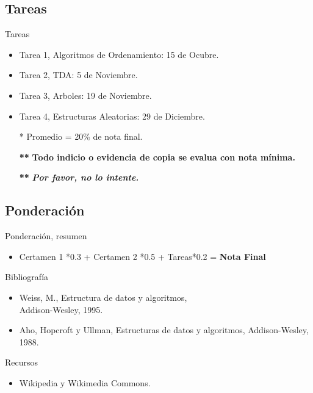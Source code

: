 \documentclass{beamer} %
\begin{document}
\subsection{Tareas}
\begin{frame}
  \begin{block}{Tareas}
  \begin{itemize}
    \item Tarea 1, Algoritmos de Ordenamiento: 15 de Ocubre.
    \item Tarea 2, TDA: 5 de Noviembre.
    \item Tarea 3, Arboles: 19 de Noviembre.
    \item Tarea 4, Estructuras Aleatorias: 29 de Diciembre.
    \item[*] Promedio = 20\% de nota final.
    \item[\textbf{**}] \textbf{Todo indicio o evidencia de copia se evalua con nota mínima.}
    \item[\textbf{**}] \textit{\textbf{Por favor, no lo intente.}}
  \end{itemize}

\end{block}
\end{frame}

\subsection{Ponderación}
\begin{frame}
  \begin{block}{Ponderación, resumen}

  \begin{itemize}
    \item Certamen 1 *0.3 + Certamen 2 *0.5 + Tareas*0.2 = \textbf{Nota Final}
  \end{itemize}
\end{block}
\end{frame}


\begin{frame}
 \begin{block}{Bibliografía}
  \begin{itemize}
    \item Weiss, M., Estructura de datos y algoritmos,\\ Addison-Wesley, 1995.
    \item Aho, Hopcroft y Ullman, Estructuras de datos y algoritmos, Addison-Wesley, 1988.
  \end{itemize}
 \end{block}
 \begin{block}{Recursos}
  \begin{itemize}
    \item Wikipedia y Wikimedia Commons.
  \end{itemize}
 \end{block}
\end{frame}
\end{document}
